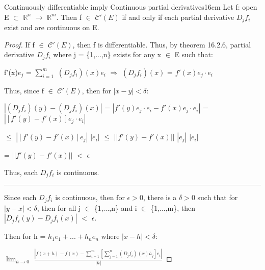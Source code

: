     \newpage



    \begin{wtheorem}{Continuously differentiable imply Continuous
    partial derivatives}{16cm}
        Let f: open E $\subset$ $\mathbb{R}^n$ $\rightarrow$ $\mathbb{R}^m$.
        Then f $\in$ $\mathscr{C}'(E)$ if and only if
        each partial derivative $D_jf_i$ exist and are continuous on E.
    \end{wtheorem}

    \begin{proof}
        If f $\in$ $\mathscr{C}'(E)$, then f is differentiable.
        Thus, by {\color{red} theorem 16.2.6}, partial derivative $D_jf_i$
        where j = \{1,...,n\} exists for any x $\in$ E such that:

        \hspace{0.5cm}
        f'(x)$e_j$ = $\sum_{i=1}^m$ $(D_jf_i)(x)e_i$
        \hspace{1cm}
        $\Rightarrow$
        \hspace{1cm}
        $(D_jf_i)(x)$ = $f'(x)e_j \cdot e_i$

        Thus, since f $\in$ $\mathscr{C}'(E)$, then for $|x-y| < \delta$:

        \hspace{0.5cm}
        $|(D_jf_i)(y) - (D_jf_i)(x)|$
        = $|f'(y)e_j \cdot e_i - f'(x)e_j \cdot e_i|$
        = $|[f'(y) - f'(x)]e_j \cdot e_i|$

        \hspace{4.75cm}
        $\leq$ $|[f'(y) - f'(x)]e_j|$ $|e_i|$
        $\leq$ $||f'(y) - f'(x)||$ $|e_j|$ $|e_i|$

        \hspace{4.75cm}
        = $||f'(y) - f'(x)||$ $<$ $\epsilon$

        Thus, each $D_jf_i$ is continuous.

        \rule[0.1cm]{15.3cm}{0.01cm}

        Since each $D_jf_i$ is continuous, then for $\epsilon > 0$,
        there is a $\delta > 0$ such that for $|y-x| < \delta$, then
        for all j $\in$ \{1,...,n\} and i $\in$ \{1,...,m\}, then
        $|D_jf_i(y) - D_jf_i(x)|$ $<$ $\epsilon$.

        Then for h = $h_1e_1 + ... + h_ne_n$ where $|x-h| < \delta$:

        \hspace{0.5cm}
        $\lim_{h \rightarrow 0}$
        $\frac{|f(x+h) - f(x)
                - \sum_{i=1}^m [\sum_{j=1}^n (D_jf_i)(x)h_j]e_i|}{|h|}$


\end{proof}
